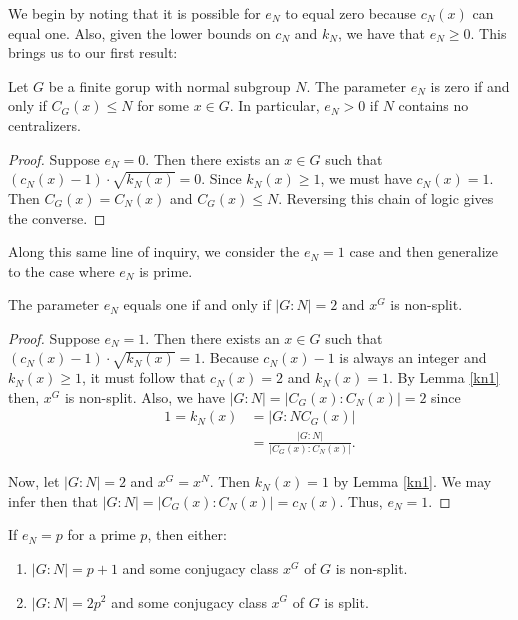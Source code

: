 \documentclass[main.tex]{subfiles}
\begin{document}
We begin by noting that it is possible for $e_N$ to equal zero because $c_N(x)$ can equal one. Also, given the lower bounds on $c_N$ and $k_N$, we have that $e_N \ge 0$. This brings us to our first result:

\begin{theorem}\label{en0}
Let $G$ be a finite gorup with normal subgroup $N$. The parameter $e_N$ is zero if and only if $C_G(x) \le N$ for some $x \in G$. In particular, $e_N > 0$ if $N$ contains no centralizers.
\end{theorem}

\begin{proof}
Suppose $e_N = 0$. Then there exists an $x \in G$ such that $(c_N(x) - 1) \cdot \sqrt{k_N(x)} = 0$. Since $k_N(x) \ge 1$, we must have $c_N(x) = 1$. Then $C_G(x) = C_N(x)$ and $C_G(x) \le N$. Reversing this chain of logic gives the converse.
\end{proof}

Along this same line of inquiry, we consider the $e_N = 1$ case and then generalize to the case where $e_N$ is prime.

\begin{theorem}\label{en1}
The parameter $e_N$ equals one if and only if $|G:N| = 2$ and $x^G$ is non-split.
\end{theorem}

\begin{proof}
Suppose $e_N = 1$. Then there exists an $x \in G$ such that $(c_N(x) - 1) \cdot \sqrt{k_N(x)} = 1$. Because $c_N(x) - 1$ is always an integer and $k_N(x) \ge 1$, it must follow that $c_N(x) = 2$ and $k_N(x) = 1$. By Lemma \ref{kn1} then, $x^G$ is non-split. Also, we have $|G : N| = |C_G(x) : C_N(x)| = 2$ since
\begin{align*}
1 = k_N(x) &= |G : NC_G(x)| \\
&= \frac{|G : N|}{|C_G(x) : C_N(x)|} \text{.}
\end{align*}

Now, let $|G:N| = 2$ and $x^G = x^N$. Then $k_N(x) = 1$ by Lemma \ref{kn1}. We may infer then that $|G : N| = |C_G(x) : C_N(x)| = c_N(x)$. Thus, $e_N = 1$. 
\end{proof}

\begin{theorem}
If $e_N = p$ for a prime $p$, then either:
\begin{enumerate}
	\item $|G:N| = p + 1$ and some conjugacy class $x^G$ of $G$ is non-split.
	\item $|G:N| = 2p^2$ and some conjugacy class $x^G$ of $G$ is split.
\end{enumerate}
\end{theorem}
\end{document}
